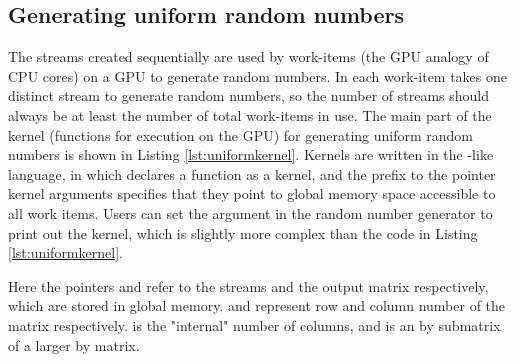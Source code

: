 \documentclass[article,nojss]{jss}\usepackage[]{graphicx}\usepackage[]{color}
\newcommand{\fct}[1]{\code{#1()}}
\begin{document}








\subsection{Generating uniform random numbers}

The streams created sequentially are used by work-items (the GPU analogy of CPU cores) on a GPU to generate random numbers. In  each work-item takes one distinct stream to generate random numbers, so the number of streams should always be at least the number of total work-items in use. The main part of the kernel (functions for execution on the GPU) for generating uniform random numbers is shown in Listing \ref{lst:uniformkernel}. Kernels are written in the -like  language, in which  declares a function as a kernel, and the  prefix to the pointer kernel arguments specifies that they point to global memory space accessible to all work items.  Users can set the argument  in the random number generator to print out the kernel, which is slightly more complex than the code in Listing \ref{lst:uniformkernel}. 
  
Here the pointers  and  refer to the streams and the  output matrix respectively, which are stored in global memory.  and  represent row and column number of the matrix  respectively.    is the "internal" number of columns, and  is an  by  submatrix of a larger  by  matrix.
\end{document}
